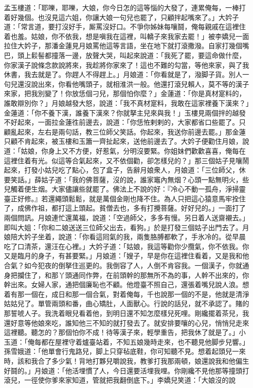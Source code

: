 {}孟玉樓道：「耶嚛，耶嚛，大娘，你今日怎的這等惱的大發了，連累俺每，一棒打着好幾個。也沒見這六姐，你讓大娘一句兒也罷了，只顧拌起嘴來了。」大妗子道：「常言道，要打沒好手，厮罵沒好口。不爭你姊妹每嚷鬪，俺每親戚在這裡住着也羞。姑娘，你不依我，想是嗔我在這裡，叫轎子來我家去罷！」被李嬌兒一面拉住大妗子，那潘金蓮見月娘罵他這等言語，坐在地下就打滾撒潑。{}自家打幾個嘴巴，{}頭上鬏髻都撞落一邊，放聲大哭，叫起來說道：「我死了罷，要這命做什麼，你家漢子說條念款說將來，我趁將你家來了！這也不難的勾當，等他來家，與了我休書，我去就是了。你趕人不得趕上。」月娘道：「你看就是了，潑脚子貨。別人一句兒還沒說出來，你看他嘴頭子，就相淮洪一般。他還打滾兒賴人，莫不等的漢子來家，把我別變了！你放恁個刁兒，那個怕你麼？」金蓮道：「你是真材寔料的，誰敢辯別你？」月娘越發大怒，說道：「我不真材寔料，我敢在這家裡養下漢來？」{}金蓮道：「你不養下漢，誰養下漢來？你就拏主兒來與我！」{}玉樓見兩個拌的越發不好起來，一面拉金蓮徃前邊去，說道：「你恁恠剌剌的，大家都省口些罷了。只顧亂起來，左右是兩句話，教三位師父笑話。你起來，我送你前邊去罷。」那金蓮只顧不肯起來，被玉樓和玉簫一齊扯起來，送他前邊去了。大妗子便勸住月娘，說道：「姑娘，你身上又不方便，好惹氣，分明沒要緊。你姐妹們歡歡喜喜，俺每在這裡住着有光。似這等合氣起來，又不依個勸，卻怎樣兒的？」那三個姑子見嚷鬧起來，打發小姑兒吃了點心，包了盒子，告辭月娘衆人，月娘道：「三位師父，休要笑話。」薛姑子道：「我的佛菩薩，沒的說，誰家竈內無烟？心頭一點無明火，些兒觸着便生烟。大家儘讓些就罷了。{}佛法上不說的好：『冷心不動一孤舟，淨掃靈臺正好修。』若還繩頭鬆鬆，就是萬個金剛也降不住。為人只把這心猿意馬牢拴住了，成佛作祖，都打這上頭起。{}貧僧去也，多有打攪菩薩。好好兒的。」一面打了兩個問訊。月娘連忙還萬福，說道：「空過師父，多多有慢。另日着人送齋襯去。」即叫大姐：「你和二娘送送三位師父出去，看狗。」於是打發三個姑子出門去了。月娘陪大妗子坐着，說道：「你看這囘氣的我，兩隻胳膊都軟了，手氷冷的。從早晨吃了口清茶，還汪在心裡。」大妗子道：「姑娘，我這等勸你少攬氣，你不依我。你又是臨月的身子，有甚要緊。」月娘道：「嫂子，早是你在這裡住看着，又是我和他合氣？如今犯夜的倒拏住巡更的。我倒容了人，人倒不肯容我。{}一個漢子，你就通身把攔住了，和那丫頭通同作弊，在前頭幹的那無所不為的事，人幹不出來的，你幹出來。女婦人家，通把個廉恥也不顧。他燈臺不照自己，還張着嘴兒說人浪。想着有那一個在，成日和那一個合氣，對着俺每，千也說那一個的不是，他就是清淨姑姑兒了。單管兩頭和番，曲心矯肚，人面獸心。行說的話兒，就不承認了。賭的那誓唬人子。我洗着眼兒看着他，到明日還不知怎麼樣兒死哩。剛纔擺着茶兒，我還好意等他娘來吃，誰知他三不知的就打發去了。就安排要嚷的心兒，悄悄兒走來這裡聽。聽怎的？那個怕你不成！待等漢子來，輕學重告，把我休了就是了。」小玉道：「俺每都在屋裡守着爐臺站着，不知五娘幾時走來，也不聽見他脚步兒響。」孫雪娥道：「他單會行鬼路兒，脚上只穿毡底鞋，你可知聽不見。想着起頭兒一來時，該和我合了多少氣！背地打夥兒嚼說我，教爹打我那兩頓，娘還說我和他偏生好鬪的。」{}月娘道：「他活埋慣了人，今日還要活埋我哩。你剛纔不見他那等撞頭打滾兒，一徑使你爹來家知道，管就把我翻倒底下。」李嬌兒笑道：「大娘沒的說